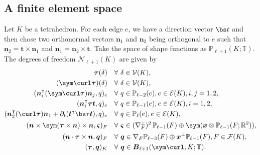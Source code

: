 \subsection{A finite element space}
Let $K$ be a tetrahedron. For each edge $e$, we have a direction vector $\bs t$ and then chose two orthonormal vectors $\boldsymbol n_1$ and $\boldsymbol n_2$ being orthogonal to $e$ such that $\boldsymbol n_2=\boldsymbol t\times\boldsymbol n_1$ and $\boldsymbol n_1=\boldsymbol n_2\times\boldsymbol t$. 
Take the space of shape functions as $\mathbb P_{\ell+1}(K;\mathbb T)$.
The degrees of freedom $\mathcal N_{\ell+1}(K)$ are given by
{\small
\begin{align}
\boldsymbol \tau(\delta) & \quad\forall~\delta\in \mathcal V(K), \label{Hsymcurlfem3ddof1}\\
(\sym\curl\boldsymbol \tau )(\delta) & \quad\forall~\delta\in \mathcal V(K), \label{Hsymcurlfem3ddof2}\\
(\boldsymbol  n_i^{\intercal}(\sym\curl\boldsymbol \tau )\boldsymbol n_j, q)_e & \quad\forall~q\in\mathbb P_{\ell-2}(e),  e\in\mathcal E(K), i,j=1,2, \label{Hsymcurlfem3ddof3}\\
(\boldsymbol  n_i^{\intercal}\boldsymbol \tau\boldsymbol t, q)_e & \quad\forall~q\in\mathbb P_{\ell-1}(e),  e\in\mathcal E(K), i=1,2,\label{Hsymcurlfem3ddof4}\\
(\boldsymbol n_{2}^{\intercal}(\curl\boldsymbol \tau)\boldsymbol n_1 + \partial_{t}(\boldsymbol t^{\intercal}\bs\tau\boldsymbol t), q)_e & \quad\forall~q\in\mathbb P_{\ell}(e),  e\in\mathcal E(K),\label{Hsymcurlfem3ddof5}\\
(\boldsymbol n\times\sym(\boldsymbol\tau\times\boldsymbol n)\times\boldsymbol n, \boldsymbol \varsigma)_F &\quad\forall~\boldsymbol \varsigma\in (\nabla_F^{\bot})^2\, \mathbb P_{\ell-1}(F)\oplus
 \sym (\boldsymbol x\otimes \mathbb P_{\ell-1}(F;\mathbb R^2)), \label{Hsymcurlfem3ddof6}\\
(\boldsymbol n\cdot \boldsymbol\tau\times\boldsymbol n, \boldsymbol q)_F & \quad\forall~\boldsymbol q\in\nabla_F\mathbb P_{\ell-3}(F)\oplus\boldsymbol x^{\perp}\mathbb P_{\ell-1}(F),  F\in\mathcal F(K),\label{Hsymcurlfem3ddof7}\\
(\boldsymbol \tau, \boldsymbol q)_K & \quad\forall~\boldsymbol q\in\boldsymbol B_{\ell+1}(\sym\curl, K;\mathbb T). \label{Hsymcurlfem3ddof8} 

\end{align}}
